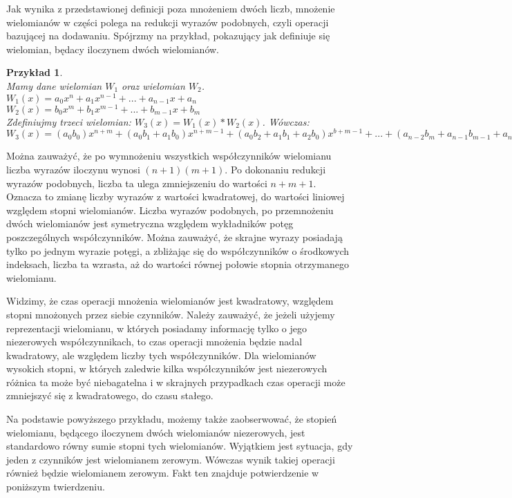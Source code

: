 \documentclass[oneside,a4paper]{book}
\newtheorem{example}{Przykład}
\begin{document}
	Jak wynika z przedstawionej definicji poza mnożeniem dwóch liczb, mnożenie wielomianów w części polega na redukcji wyrazów podobnych, czyli operacji bazującej na dodawaniu. Spójrzmy na przykład, pokazujący jak definiuje się wielomian, będacy iloczynem dwóch wielomianów.
	
	\begin{example}
		$ $\\
		Mamy dane wielomian $W_1$ oraz wielomian $W_2$. \\
		$W_1(x) = a_0x^n + a_1x^{n-1} + ... + a_{n-1}x + a_n$ \\
		$W_2(x) = b_0x^m + b_1x^{m-1} + ... + b_{m-1}x + b_m$ \\
		Zdefiniujmy trzeci wielomian: $W_3(x) = W_1(x) * W_2(x)$. Wówczas: \\
		$W_3(x) = (a_0b_0)x^{n+m} + (a_0b_1+a_1b_0)x^{n+m-1} + (a_0b_2+a_1b_1+a_2b_0)x^{b+m-1} + ... + (a_{n-2}b_m+a_{n-1}b_{m-1}+a_nb_{m-2})x^2 + (a_{n-1}b_m + a_nb_{m-1})x + a_nb_m$
	\end{example}
	
	Można zauważyć, że po wymnożeniu wszystkich współczynników wielomianu liczba wyrazów iloczynu wynosi $(n+1)(m+1)$. Po dokonaniu redukcji wyrazów podobnych, liczba ta ulega zmniejszeniu do wartości $n+m+1$. Oznacza to zmianę liczby wyrazów z wartości kwadratowej, do wartości liniowej względem stopni wielomianów. Liczba wyrazów podobnych, po przemnożeniu dwóch wielomianów jest symetryczna względem wykładników potęg poszczególnych współczynników. Można zauważyć, że skrajne wyrazy posiadają tylko po jednym wyrazie potęgi, a zbliżając się do współczynników o środkowych indeksach, liczba ta wzrasta, aż do wartości równej połowie stopnia otrzymanego wielomianu.
	
	Widzimy, że czas operacji mnożenia wielomianów jest kwadratowy, względem stopni mnożonych przez siebie czynników. Należy zauważyć, że jeżeli użyjemy reprezentacji wielomianu, w których posiadamy informację tylko o jego niezerowych współczynnikach, to czas operacji mnożenia będzie nadal kwadratowy, ale względem liczby tych współczynników. Dla wielomianów wysokich stopni, w których zaledwie kilka współczynników jest niezerowych różnica ta może być niebagatelna i w skrajnych przypadkach czas operacji może zmniejszyć się z kwadratowego, do czasu stałego.
	
	Na podstawie powyższego przykładu, możemy także zaobserwować, że stopień wielomianu, będącego iloczynem dwóch wielomianów niezerowych, jest standardowo równy sumie stopni tych wielomianów. Wyjątkiem jest sytuacja, gdy jeden z czynników jest wielomianem zerowym. Wówczas wynik takiej operacji również będzie wielomianem zerowym. Fakt ten znajduje potwierdzenie w poniższym twierdzeniu.
	
\end{document}
